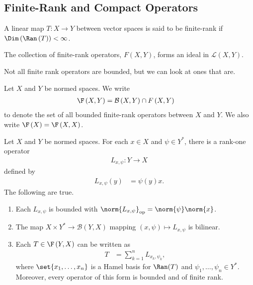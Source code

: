 \documentclass[10pt]{mypackage}
\begin{document}
\subsection{Finite-Rank and Compact Operators}%
\begin{definition}
  A linear map $T: X\rightarrow Y$ between vector spaces is said to be finite-rank if $\Dim\left(\Ran\left(T\right)\right) < \infty$.\newline

  The collection of finite-rank operators, $F\left(X,Y\right)$, forms an ideal in $\mathcal{L}\left(X,Y\right)$.
\end{definition}
Not all finite rank operators are bounded, but we can look at ones that are.
\begin{definition}
  Let $X$ and $Y$ be normed spaces. We write
  \begin{align*}
    \F\left(X,Y\right) &= \mathcal{B}\left(X,Y\right)\cap F\left(X,Y\right)
  \end{align*}
  to denote the set of all bounded finite-rank operators between $X$ and $Y$. We also write $\F\left(X\right) = \F\left(X,X\right)$.
\end{definition}
\begin{proposition}
  Let $X$ and $Y$ be normed spaces. For each $x\in X$ and $\psi\in Y^{\ast}$, there is a rank-one operator
  \begin{align*}
    L_{x,\psi}: Y\rightarrow X
  \end{align*}
  defined by
  \begin{align*}
    L_{x,\psi}\left(y\right) &= \psi(y)x.
  \end{align*}
  The following are true.
  \begin{enumerate}[(1)]
    \item Each $L_{x,\psi}$ is bounded with $\norm{L_{x,\psi}}_{\text{op}} = \norm{\psi}\norm{x}$.
    \item The map $X\times Y^{\ast}\rightarrow \mathcal{B}\left(Y,X\right)$ mapping $\left(x,\psi\right)\mapsto L_{x,\psi}$ is bilinear.
    \item Each $T\in \F\left(Y,X\right)$ can be written as
      \begin{align*}
        T &= \sum_{k=1}^{n}L_{x_k,\psi_k},
      \end{align*}
      where $\set{x_1,\dots,x_n}$ is a Hamel basis for $\Ran(T)$ and $\psi_1,\dots,\psi_n\in Y^{\ast}$. Moreover, every operator of this form is bounded and of finite rank.
  \end{enumerate}
\end{proposition}
\end{document}

